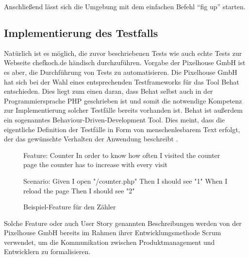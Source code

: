Anschließend lässt sich die Umgebung mit dem einfachen Befehl "`fig up"' starten.

\subsection{Implementierung des Testfalls}

Natürlich ist es möglich, die zuvor beschriebenen Tests wie auch echte Tests zur Webseite chefkoch.de händisch durchzuführen. Vorgabe der Pixelhouse GmbH ist es aber, die Durchführung von Tests zu automatisieren. Die Pixelhouse GmbH hat sich bei der Wahl eines entsprechenden Testframeworks für das Tool Behat entschieden. Dies liegt zum einen daran, dass Behat selbst auch in der Programmiersprache PHP geschrieben ist und somit die notwendige Kompetenz zur Implementierung solcher Testfälle bereits vorhanden ist. Behat ist außerdem ein sogenanntes Behaviour-Driven-Development Tool. Dies meint, dass die eigentliche Definition der Testfälle in Form von menschenlesbarem Text erfolgt, der das gewünschte Verhalten der Anwendung beschreibt \citep[Vgl.][]{Behat15}.

\begin{figure}[!ht]
  \begin{center}
    \begin{gherkincode}
Feature: Counter
  In order to know how often I visited the counter page
  the counter has to increase with every visit

  Scenario:
    Given I open "/counter.php"
    Then I should see "1"
    When I reload the page
    Then I should see "2"

    \end{gherkincode}
    \caption{Beispiel-Feature für den Zähler}
  \end{center}
\end{figure}

Solche Feature oder auch User Story genannten Beschreibungen werden von der Pixelhouse GmbH bereits im Rahmen ihrer Entwicklungsmethode Scrum verwendet, um die Kommunikation zwischen Produktmanagement und Entwicklern zu formalisieren.

